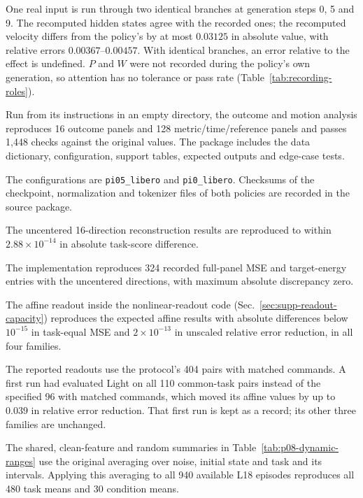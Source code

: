 \begin{description}\small
\item[Recomputed hidden states and velocities.] One real input is run through two identical branches at generation steps 0, 5 and 9. The recomputed hidden states agree with the recorded ones; the recomputed velocity differs from the policy's by at most $0.03125$ in absolute value, with relative errors $0.00367$--$0.00457$. With identical branches, an error relative to the effect is undefined. $P$ and $W$ were not recorded during the policy's own generation, so attention has no tolerance or pass rate (Table~\ref{tab:recording-roles}).
\item[Case-level analysis.] Run from its instructions in an empty directory, the outcome and motion analysis reproduces 16 outcome panels and 128 metric/time/reference panels and passes 1,448 checks against the original values. The package includes the data dictionary, configuration, support tables, expected outputs and edge-case tests.
\item[Policies.] The configurations are \texttt{pi05\_libero} and \texttt{pi0\_libero}. Checksums of the checkpoint, normalization and tokenizer files of both policies are recorded in the source package.
\item[Reconstruction.] The uncentered 16-direction reconstruction results are reproduced to within $2.88\times10^{-14}$ in absolute task-score difference.
\item[Affine readout.] The implementation reproduces 324 recorded full-panel MSE and target-energy entries with the uncentered directions, with maximum absolute discrepancy zero.
\item[Nonlinear readouts.] The affine readout inside the nonlinear-readout code (Sec.~\ref{sec:supp-readout-capacity}) reproduces the expected affine results with absolute differences below $10^{-15}$ in task-equal MSE and $2\times10^{-13}$ in unscaled relative error reduction, in all four families.
\item[Corrected readout support.] The reported readouts use the protocol's 404 pairs with matched commands. A first run had evaluated Light on all 110 common-task pairs instead of the specified 96 with matched commands, which moved its affine values by up to $0.039$ in relative error reduction. That first run is kept as a record; its other three families are unchanged.
\item[Later-observation summaries.] The shared, clean-feature and random summaries in Table~\ref{tab:p08-dynamic-ranges} use the original averaging over noise, initial state and task and its intervals. Applying this averaging to all 940 available L18 episodes reproduces all 480 task means and 30 condition means.

\end{description}
